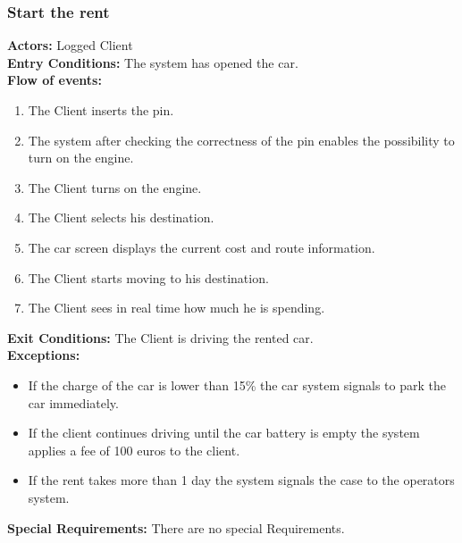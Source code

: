 \subsubsection{Start the rent}
%
\textbf{Actors:}
Logged Client \\
%
\textbf{Entry Conditions:}
The system has opened the car.\\
%
\textbf{Flow of events:}
\begin{enumerate}
\item The Client inserts the pin.
\item The system after checking the correctness of the pin enables the possibility to turn on the engine.
\item The Client turns on the engine.
\item The Client selects his destination.
\item The car screen displays the current cost and route information.
\item The Client starts moving to his destination.
\item The Client sees in real time how much he is spending.
\end{enumerate}
\textbf{Exit Conditions:}
The Client is driving the rented car.\\
%
\textbf{Exceptions:}
\begin{itemize}
\item If the charge of the car is lower than 15\% the car system signals to park the car immediately.
\item If the client continues driving until the car battery is empty the system applies a fee of 100 euros to the client.
\item If the rent takes more than 1 day the system signals the case to the operators system.
\end{itemize}
%
\textbf{Special Requirements:}
There are no special Requirements.


